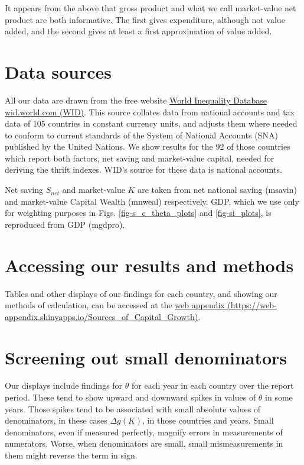 \documentclass[a4padisinvitingper,fleqn]{latex_styles/cas-sc}
\begin{document}
It appears from the above that gross product and what we call market-value net product are both informative. The first gives expenditure, although not value added, and the second gives at least a first approximation of value added.
%



\hypertarget{data-sources}{%
\section{Data sources}\label{data-sources}}

All our data are drawn from the free website \href{wid.world.com}{World
Inequality Database wid.world.com (WID)}. This source collates data from national accounts and tax data
of 105 countries in constant currency units, and adjusts them where needed to conform to current standards of the System of National Accounts
(SNA) published by the United Nations. We show results for the 92 of
those countries which report both factors, net
saving and market-value capital, needed for deriving
the thrift indexes. WID's source for these data is national accounts.

Net saving $S_{net}$ and market-value $K$ are taken from net national saving (msavin) and market-value Capital Wealth (mnweal) respectively. GDP, which we use only for weighting purposes in Figs. \ref{fig-s_c_theta_plots} and \ref{fig-si_plots}, is reproduced from GDP (mgdpro).

\hypertarget{accessing-our-results-and-methods}{%
\section{Accessing our results and
methods}\label{accessing-our-results-and-methods}}

Tables and other displays of our findings for each country, and showing
our methods of calculation, can be accessed at the
\href{https://web-appendix.shinyapps.io/Sources_of_Capital_Growth/}{web appendix (https://web-appendix.shinyapps.io/Sources\_of\_Capital\_Growth)}.

\hypertarget{sec-displays}{%
\section{Screening out small denominators}\label{sec-displays}}

Our displays include findings for \(\theta\) 
for each year in each country over the report period. These tend to show
upward and downward spikes in values of \(\theta\)
in some years. Those spikes tend to be associated with small absolute
values of denominators, in these cases \(\Delta g(K)\), in those
countries and years. Small denominators, even if measured perfectly, magnify errors in measurements
of numerators. Worse, when denominators are small, small mismeasurements in them might reverse the term in sign.
\end{document}
